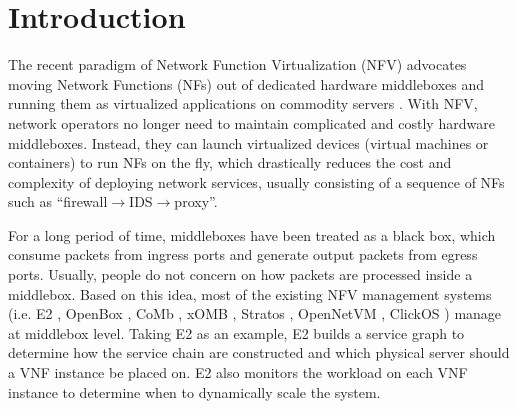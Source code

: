 \section{Introduction}

The recent paradigm of Network Function Virtualization (NFV) advocates moving Network Functions (NFs) out of dedicated hardware middleboxes and running them as virtualized applications on commodity servers \cite{nfv-white-paper}. With NFV, network operators no longer need to maintain complicated and costly hardware middleboxes. Instead, they can launch virtualized devices (virtual machines or containers) to run NFs on the fly, which drastically reduces the cost and complexity of deploying network services, usually consisting of a sequence of NFs such as ``firewall$\rightarrow$IDS$\rightarrow$proxy''.


For a long period of time, middleboxes have been treated as a black box, which consume packets from ingress ports and generate output packets from egress ports. Usually, people do not concern on how packets are processed inside a middlebox. Based on this idea, most of the existing NFV management systems (i.e. E2 \cite{palkar2015e2}, OpenBox \cite{bremler2015openbox}, CoMb \cite{sekar2012design}, xOMB \cite{anderson2012xomb}, Stratos \cite{gember2012stratos}, OpenNetVM \cite{hwang2015netvm, zhang2016opennetvm}, ClickOS \cite{martins2014clickos}) manage at middlebox level. Taking E2 \cite{palkar2015e2} as an example, E2 builds a service graph to determine how the service chain are constructed and which physical server should a VNF instance be placed on. E2 also monitors the workload on each VNF instance to determine when to dynamically scale the system.


